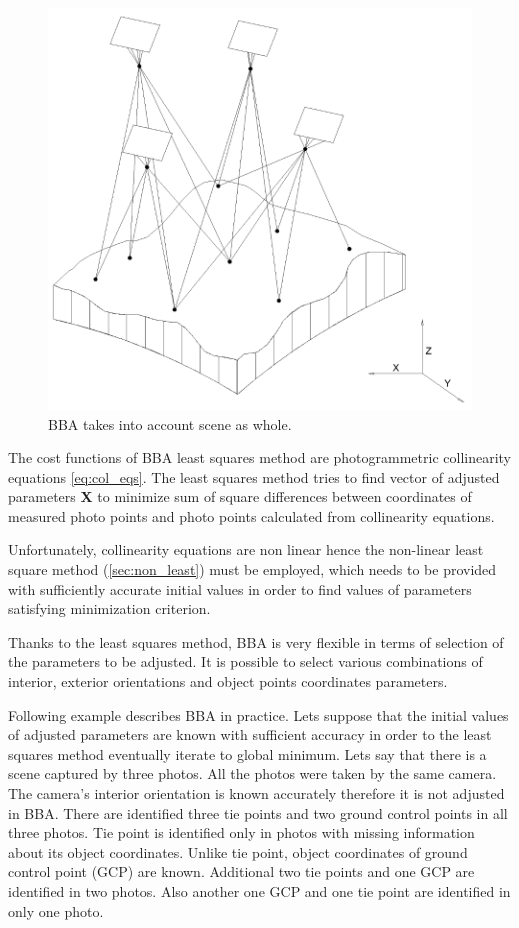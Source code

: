 \documentclass[a4paper,12pt]{article}
\newcommand{\evect}[1]{%
{\bf #1}%
}
\begin{document}
\begin{figure}[h]
    \centering
    \includegraphics[scale=0.3]{figures/bba.png}
    \caption{BBA takes into account scene as whole.}
    \label{fig:rel_or_amb}
\end{figure}

The cost functions of BBA least squares method are photogrammetric collinearity equations \eqref{eq:col_eqs}.
The least squares method tries to find vector of adjusted parameters \evect{X} to minimize
sum  of square differences between coordinates of measured photo points and photo points calculated 
from collinearity equations.

Unfortunately, collinearity equations are non linear hence the non-linear least square method (\ref{sec:non_least}) must be employed, which 
needs to be provided  with sufficiently accurate initial values in order to find values of parameters satisfying minimization criterion.

Thanks to the least squares method, BBA is very flexible in terms of selection of the parameters to be adjusted. 
It is possible to select various combinations of interior, exterior orientations and object points coordinates parameters. 

Following example describes BBA in practice.
Lets suppose that the initial values of adjusted parameters are known with sufficient accuracy in order to the least squares
method eventually iterate to global minimum.
Lets say that there is a scene captured by three photos.
All the photos were taken by the same camera.
The camera's interior orientation is known accurately therefore it is not adjusted in BBA.
There are identified three tie points and two ground control points in all three photos.
Tie point is identified only in photos with missing information about its object coordinates.  
Unlike tie point, object coordinates of ground control point (GCP) are known.
Additional two tie points and one GCP are identified in two photos.
Also another one GCP and one tie point are identified 
in only one photo. 
\end{document}
